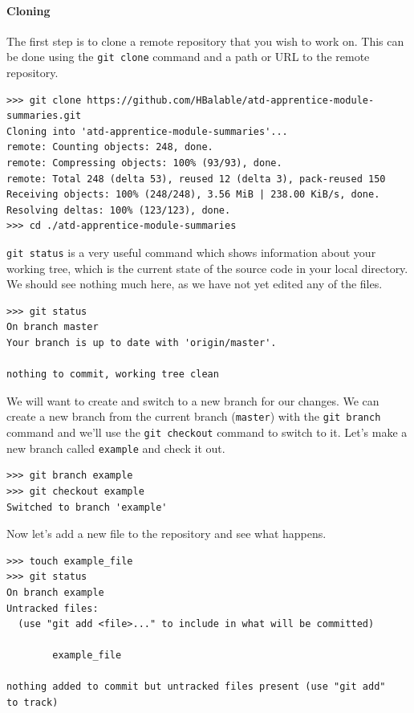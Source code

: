 \hypertarget{cloning}{%
\paragraph{Cloning}\label{cloning}}

The first step is to clone a remote repository that you wish to work on. This can be done using the \texttt{git\ clone} command and a path or URL to the remote repository.

\begin{verbatim}
>>> git clone https://github.com/HBalable/atd-apprentice-module-
summaries.git
Cloning into 'atd-apprentice-module-summaries'...
remote: Counting objects: 248, done.
remote: Compressing objects: 100% (93/93), done.
remote: Total 248 (delta 53), reused 12 (delta 3), pack-reused 150
Receiving objects: 100% (248/248), 3.56 MiB | 238.00 KiB/s, done.
Resolving deltas: 100% (123/123), done.
>>> cd ./atd-apprentice-module-summaries
\end{verbatim}

\texttt{git\ status} is a very useful command which shows information about your working tree, which is the current state of the source code in your local directory. We should see nothing much here, as we have not yet edited any of the files.

\begin{verbatim}
>>> git status
On branch master
Your branch is up to date with 'origin/master'.

nothing to commit, working tree clean
\end{verbatim}

We will want to create and switch to a new branch for our changes. We can create a new branch from the current branch (\texttt{master}) with the \texttt{git\ branch} command and we'll use the \texttt{git\ checkout} command to switch to it. Let's make a new branch called \texttt{example} and check it out.

\begin{verbatim}
>>> git branch example
>>> git checkout example
Switched to branch 'example'
\end{verbatim}

Now let's add a new file to the repository and see what happens.


\pagebreak

\begin{verbatim}
>>> touch example_file
>>> git status 
On branch example
Untracked files:
  (use "git add <file>..." to include in what will be committed)

        example_file

nothing added to commit but untracked files present (use "git add" 
to track)
\end{verbatim}


